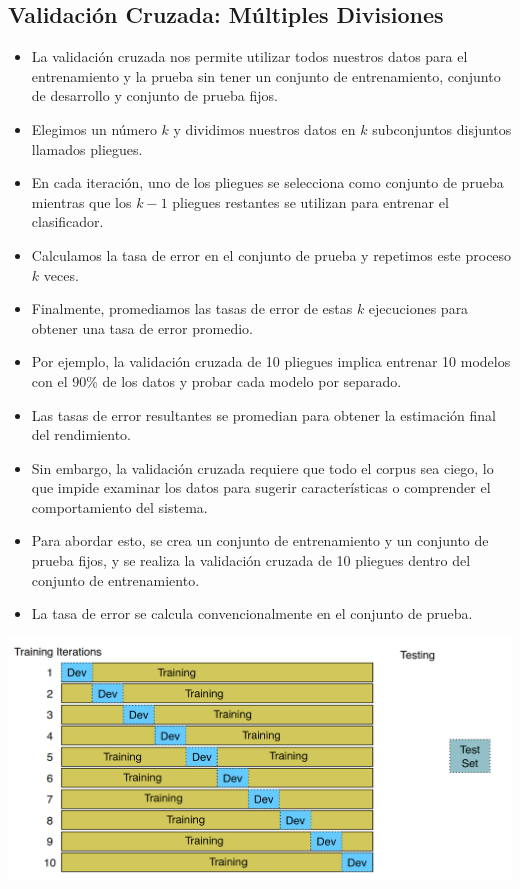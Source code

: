 \documentclass[11pt,fleqn]{book} %
\begin{document}
\subsection{Validación Cruzada: Múltiples Divisiones}

\begin{itemize}
\item La validación cruzada nos permite utilizar todos nuestros datos para el entrenamiento y la prueba sin tener un conjunto de entrenamiento, conjunto de desarrollo y conjunto de prueba fijos.
\item Elegimos un número $k$ y dividimos nuestros datos en $k$ subconjuntos disjuntos llamados pliegues.
\item En cada iteración, uno de los pliegues se selecciona como conjunto de prueba mientras que los $k-1$ pliegues restantes se utilizan para entrenar el clasificador.
\item Calculamos la tasa de error en el conjunto de prueba y repetimos este proceso $k$ veces.
\item Finalmente, promediamos las tasas de error de estas $k$ ejecuciones para obtener una tasa de error promedio.
\item Por ejemplo, la validación cruzada de 10 pliegues implica entrenar 10 modelos con el 90\% de los datos y probar cada modelo por separado.
\item Las tasas de error resultantes se promedian para obtener la estimación final del rendimiento.
\item Sin embargo, la validación cruzada requiere que todo el corpus sea ciego, lo que impide examinar los datos para sugerir características o comprender el comportamiento del sistema.
\item Para abordar esto, se crea un conjunto de entrenamiento y un conjunto de prueba fijos, y se realiza la validación cruzada de 10 pliegues dentro del conjunto de entrenamiento.
\item La tasa de error se calcula convencionalmente en el conjunto de prueba.
\end{itemize}


\begin{center}
\includegraphics[scale=0.28]{pics/cv.png}
\end{center}
\end{document}
